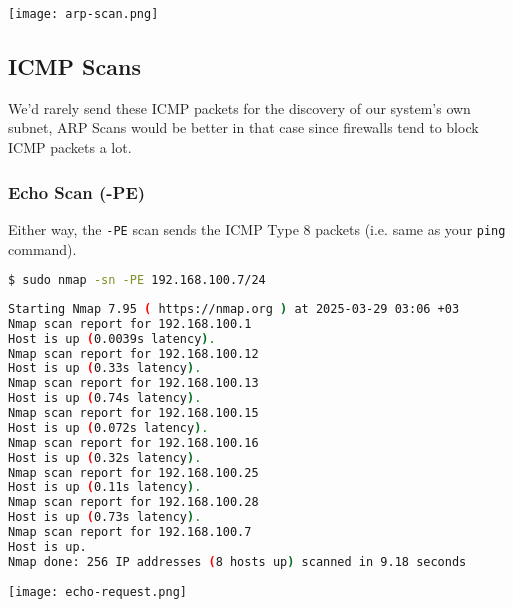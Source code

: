 \documentclass[11pt,a4paper]{article}
\newenvironment{commandbox}[1][]{
  \begin{tcolorbox}[
      colback=kalibackground,
      colframe=commandcolor,
      fonttitle=\bfseries\color{white},
      title=#1,
      breakable=true
    ]
  }{
  \end{tcolorbox}
}
\begin{document}
\vspace{-15pt}
\begin{center}
  \texttt{[image: arp-scan.png]}
  \label{fig:arp-scan}
\end{center}

\subsection{ICMP Scans}

\begin{tcolorbox}[colback=codebackground, colframe=warningcolor]
  We'd rarely send these ICMP packets for the discovery of our
  system's own subnet, ARP Scans would be better in that case since
  firewalls tend to block ICMP packets a lot.
\end{tcolorbox}

\subsubsection{Echo Scan (-PE)}
Either way, the \texttt{-PE} scan sends the ICMP Type 8 packets (i.e.
same as your \texttt{ping} command).
\begin{commandbox}[ICMP Echo Scan (-PE)]
\begin{lstlisting}[language=bash, style=bash, basicstyle=\small\ttfamily\color{warningcolor}]
$ sudo nmap -sn -PE 192.168.100.7/24
\end{lstlisting}

\begin{lstlisting}[basicstyle=\small\ttfamily\color{kalitext}, language=bash, style=bash, breaklines=true, breakindent=0pt]
Starting Nmap 7.95 ( https://nmap.org ) at 2025-03-29 03:06 +03
Nmap scan report for 192.168.100.1
Host is up (0.0039s latency).
Nmap scan report for 192.168.100.12
Host is up (0.33s latency).
Nmap scan report for 192.168.100.13
Host is up (0.74s latency).
Nmap scan report for 192.168.100.15
Host is up (0.072s latency).
Nmap scan report for 192.168.100.16
Host is up (0.32s latency).
Nmap scan report for 192.168.100.25
Host is up (0.11s latency).
Nmap scan report for 192.168.100.28
Host is up (0.73s latency).
Nmap scan report for 192.168.100.7
Host is up.
Nmap done: 256 IP addresses (8 hosts up) scanned in 9.18 seconds
\end{lstlisting}
\end{commandbox}

\vspace{-5pt}
\vspace{5pt}
\begin{center}
  \texttt{[image: echo-request.png]}
  \label{fig:echo-request}
\end{center}
\end{document}
